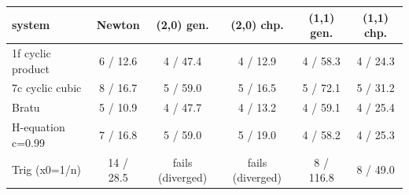 \begin{tabular}{lccccc}
\toprule
system & Newton & (2,0) gen. & (2,0) chp. & (1,1) gen. & (1,1) chp. \\
\midrule
1f cyclic product & 6 / 12.6 & 4 / 47.4 & 4 / 12.9 & 4 / 58.3 & 4 / 24.3 \\
7c cyclic cubic & 8 / 16.7 & 5 / 59.0 & 5 / 16.5 & 5 / 72.1 & 5 / 31.2 \\
Bratu & 5 / 10.9 & 4 / 47.7 & 4 / 13.2 & 4 / 59.1 & 4 / 25.4 \\
H-equation c=0.99 & 7 / 16.8 & 5 / 59.0 & 5 / 19.0 & 4 / 58.2 & 4 / 25.3 \\
Trig (x0=1/n) & 14 / 28.5 & fails (diverged) & fails (diverged) & 8 / 116.8 & 8 / 49.0 \\
\bottomrule
\end{tabular}
